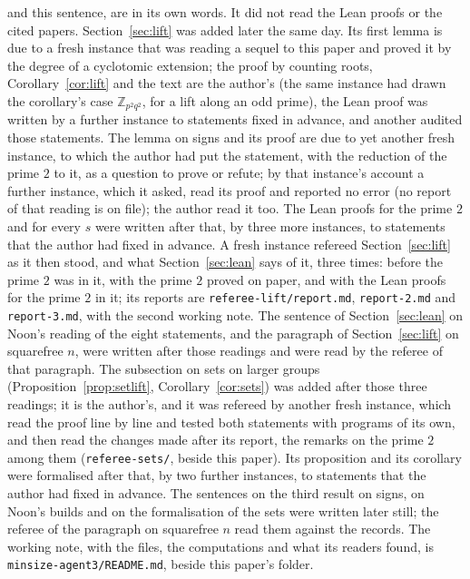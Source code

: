 \documentclass[11pt,a4paper]{amsart}
\theoremstyle{definition}
\theoremstyle{remark}
\newcommand{\Z}{\mathbb{Z}}
\begin{document}
{{and this sentence, are in its own words. It did not read the Lean proofs or the cited papers. Section~\ref{sec:lift} was added later the same day. Its first lemma is due to a fresh instance that was reading a sequel to this paper and proved it by the degree of a cyclotomic extension; the proof by counting roots, Corollary~\ref{cor:lift} and the text are the author's (the same instance had drawn the corollary's case $\Z_{p^2q^2}$, for a lift along an odd prime), the Lean proof was written by a further instance to statements fixed in advance, and another audited those statements. The lemma on signs and its proof are due to yet another fresh instance, to which the author had put the statement, with the reduction of the prime $2$ to it, as a question to prove or refute; by that instance's account a further instance, which it asked, read its proof and reported no error (no report of that reading is on file); the author read it too. The Lean proofs for the prime $2$ and for every $s$ were written after that, by three more instances, to statements that the author had fixed in advance.  A fresh instance refereed Section~\ref{sec:lift} as it then stood, and what Section~\ref{sec:lean} says of it, three times: before the prime $2$ was in it, with the prime $2$ proved on paper, and with the Lean proofs for the prime $2$ in it; its reports are \texttt{referee-lift/report.md}, \texttt{report-2.md} and \texttt{report-3.md}, with the second working note. The sentence of Section~\ref{sec:lean} on Noon's reading of the eight statements, and the paragraph of Section~\ref{sec:lift} on squarefree $n$, were written after those readings and were read by the referee of that paragraph. The subsection on sets on larger groups (Proposition~\ref{prop:setlift}, Corollary~\ref{cor:sets}) was added after those three readings; it is the author's, and it was refereed by another fresh instance, which read the proof line by line and tested both statements with programs of its own, and then read the changes made after its report, the remarks on the prime $2$ among them (\texttt{referee-sets/}, beside this paper). Its proposition and its corollary were formalised after that, by two further instances, to statements that the author had fixed in advance. The sentences on the third result on signs, on Noon's builds and on the formalisation of the sets were written later still; the referee of the paragraph on squarefree $n$ read them against the records. The working note, with the files, the computations and what its readers found, is \texttt{minsize-agent3/README.md}, beside this paper's folder.}}
\end{document}
